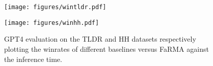 

\begin{figure}[!ht]
  \centering
    \texttt{[image: figures/wintldr.pdf]}   
\end{figure}
\begin{figure}[!ht]
  \centering
    \texttt{[image: figures/winhh.pdf]}  
  \caption{GPT4 evaluation on the TLDR and HH datasets respectively plotting the winrates of different baselines versus FaRMA against the inference time. }
  \label{fig:gpt4}
\end{figure}